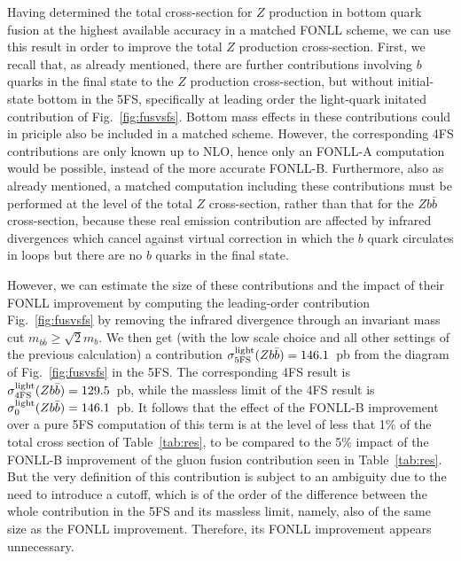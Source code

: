 \documentclass[12pt]{article}
\begin{document}
Having 
 determined the total cross-section for $Z$
production in bottom quark fusion at the highest available accuracy in
a matched FONLL scheme, we can use this result in
order to improve the total $Z$ production cross-section. First, we
recall that, as already mentioned, there are further contributions
involving $b$ quarks in the final state to the $Z$ production
cross-section, but without initial-state bottom in the 5FS,
specifically at leading order the light-quark initated contribution of
Fig.~\ref{fig:fusvsfs}. Bottom mass effects in these contributions
could in priciple also be included in a
matched scheme. However, the corresponding 4FS contributions are only
known up to NLO, hence only an FONLL-A computation would be possible,
instead of the more accurate FONLL-B. Furthermore, also as already
mentioned, a matched computation including these contributions must be
performed at the level of the total $Z$ cross-section, rather than
that for  the $Zb\bar b$ cross-section, because these real emission
contribution 
are affected by infrared divergences which cancel against virtual
correction in which the $b$ quark circulates in loops but there are no
$b$ quarks in the final state. 

However, we can estimate the size of these contributions and the
impact of their FONLL improvement by computing
the leading-order contribution Fig.~\ref{fig:fusvsfs} by removing the
infrared divergence through  an
invariant mass cut $m_{b\bar b}\ge \sqrt{2} m_b$. We then get (with the
low scale choice and all other settings of the previous calculation) a
contribution $\sigma^{\rm light}_{\rm 5FS}(Zb\bar b)=146.1$~pb from the diagram
of Fig.~\ref{fig:fusvsfs} in the 5FS. The corresponding 4FS result is 
$\sigma^{\rm light}_{\rm 4FS}(Zb\bar b)=129.5$~pb, while the massless
limit of the 4FS result is $\sigma^{\rm light}_{\rm 0}(Zb\bar
b)=146.1$~pb. It follows that the effect of the FONLL-B improvement
over a pure 5FS computation of this term is at the level of less that
1\% of the total cross section of Table~\ref{tab:res}, to be compared
to the 5\%  impact of the FONLL-B improvement of the gluon fusion
contribution seen in  Table~\ref{tab:res}. But the very
definition of this contribution is subject to an ambiguity due to the
need to introduce a cutoff, which is of the order of the difference
between the whole contribution in the 5FS 
and its massless limit, namely, also of
the same size as the FONLL improvement. Therefore, its FONLL
improvement appears unnecessary. 
\end{document}
